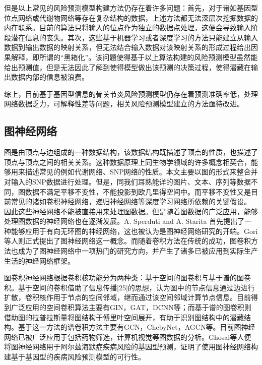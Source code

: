 但是以上常见的风险预测模型构建方法仍存在着许多问题：首先，对于诸如基因型位点网络或代谢物网络等存在复杂结构的数据，上述方法都无法深层次挖掘数据的内在联系。目前的算法只将输入的位点作为独立的数据点处理，这便会导致输入阶段潜在信息的丧失。其次，这些基于机器学习或者深度学习的方法只能建立从输入数据到输出数据的映射关系，但无法结合输入数据对该映射关系的形成过程给出因果解释，即所谓的“黑箱化”。该问题使得基于以上算法构建的风险预测模型虽然能给出预测值，但是无法因此了解到使得模型做出该预测的决策过程，使得潜藏在输出数据内部的信息被浪费。

综上，目前基于基因型信息的骨关节炎风险预测模型仍存在着预测准确率低，处理网络数据乏力，可解释性差等问题，相关风险预测模型建立的方法亟待改进。
\subsection{图神经网络}
图是由顶点与边组成的一种数据结构，该数据结构既描述了顶点的性质，也描述了顶点与顶点之间的相关关系。这种数据原理上同生物学领域的许多概念相契合，能够用来描述常见的例如代谢网络、SNP网络的性质。本文主要以图的形式来整合并对输入的SNP数据进行处理。但是，同我们耳熟能详的图片、文本、序列等数据不同，图数据不满足平移不变性，不能投影到欧几里得空间中。而平移不变性又是目前常见的诸如卷积神经网络，递归神经网络等深度学习网络所依赖的关键假设。\cite{bronstein_geometric_2017} 因此这些神经网络不能被直接用来处理图数据。但是随着图数据的广泛应用，能够处理图数据的神经网络也在逐渐发展。A. Sperduti and A. Starita\cite{sperduti_supervised_1997} 首先提出了一种能够应用于有向无环图的神经网络，这也被认为是图神经网络研究的开端。Gori\cite{gori_new_2005}等人则正式提出了图神经网络这一概念。而随着卷积方法在传统的成功，图卷积方法也成为了图神经网络中一项热门的研究方向，并产生了诸多已被应用到实际生产生活的神经网络框架。

图卷积神经网络根据卷积核功能分为两种类：基于空间的图卷积与基于谱的图卷积。基于空间的卷积借助了信息传播[25]的思想，认为图中的节点信息通过边进行扩散，卷积核作用于节点的空间邻域，继而通过该空间邻域计算节点信息。目前得到广泛应用的空间卷积算法主要有GIN\cite{xu_how_2019}，GAT\cite{velickovic_graph_2018}，DCNN\cite{atwood_diffusion-convolutional_2016}等；而基于谱的图卷积则借助图的拉普拉斯量将图结构于傅里叶空间展开，有助于识别图结构中的潜藏结构。基于这一方法的谱卷积方法主要有GCN\cite{kipf_semi-supervised_2017}，ChebyNet\cite{defferrard_convolutional_2017}，AGCN\cite{li_adaptive_2018}等。目前图神经网络已被广泛应用于包括药物筛选\cite{veselkov_hyperfoods:_2019,knyazev_spectral_2018}，计算机视觉\cite{yan_spatial_2018}等图数据的分析。Ghosal\cite{ghosal_biologically_2021}等人便将图神经网络用于阿尔兹海默症疾病风险的基因型预测，证明了使用图神经网络构建基于基因型的疾病风险预测模型的可行性。

